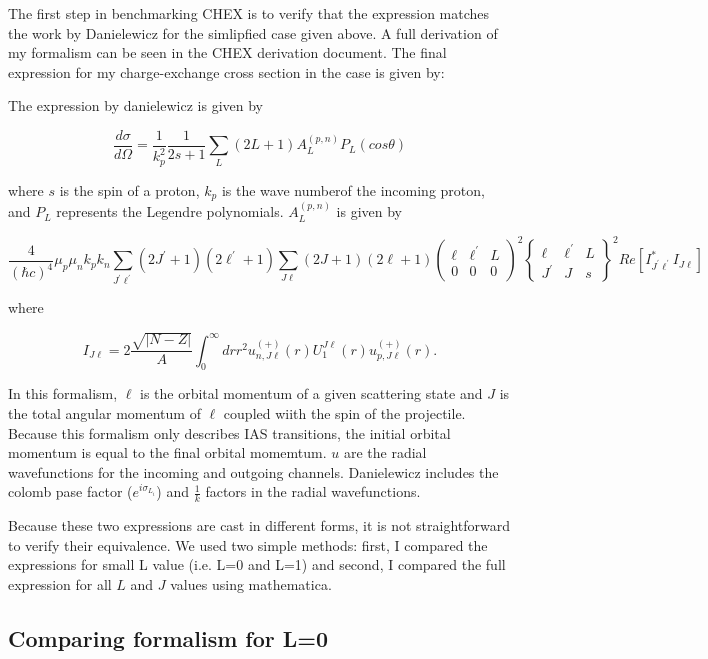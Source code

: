 \documentclass{article}
\newcommand{\Gj}[6]{ \begin{Bmatrix}
  #1 & #2 & #3 \\
  #4 & #5 & #6 
 \end{Bmatrix}}
\newcommand{\tj}[6]{ \begin{pmatrix}
  #1 & #2 & #3 \\
  #4 & #5 & #6 
 \end{pmatrix}}
\begin{document}
The first step in benchmarking CHEX is to verify that the expression matches the work by Danielewicz for the simlipfied case given above.  A full derivation of my formalism can be seen in the CHEX derivation document.  The final expression for my charge-exchange cross section in the case is given by:

The expression by danielewicz is given by

\begin{equation}\label{eq:Danielewicz1}
\frac{d\sigma}{d\Omega}=\frac{1}{k_p^2} \frac{1}{2s+1} \sum_L (2L+1) A_L^{(p,n)} P_L(cos \theta)
\end{equation}

where $s$ is the spin of a proton, $k_p$ is the wave numberof the incoming proton, and $P_L$ represents the Legendre polynomials.  $ A_L^{(p,n)}$ is given by

\begin{equation}\label{eq:Danielewicz2}
\frac{4}{(\hbar c)^4} \mu_p \mu_n k_p k_n \sum_{J^\prime \ell^\prime} (2J^\prime +1)(2 \ell^\prime +1) \sum_{J \ell}(2J+1)(2 \ell +1) \tj{\ell}{\ell^\prime}{L}{0}{0}{0}^2 \Gj{\ell}{\ell^\prime}{L}{J^\prime}{J}{s}^2 Re[I^*_{J^\prime \ell^\prime} I_{J \ell}]
\end{equation}

where

\begin{equation}\label{eq:Danielewicz3}
I_{J \ell}=2 \frac{\sqrt{|N-Z|}}{A} \int^{\infty}_{0} dr r^2 u^{(+)}_{n,J \ell}(r) U^{J \ell}_1 (r) u^{(+)}_{p,J \ell}(r).
\end{equation}

In this formalism, $\ell$ is the orbital momentum of a given scattering state and $J$ is the total angular momentum of $\ell$ coupled wiith the spin of the projectile.  Because this formalism only describes IAS transitions, the initial orbital momentum is equal to the final orbital momemtum.  $u$ are the radial wavefunctions for the incoming and outgoing channels.  Danielewicz includes the colomb pase factor ($e^{i \sigma_{L_i}}$) and $\frac{1}{k}$ factors in the radial wavefunctions.

Because these two expressions are cast in different forms, it is not straightforward to verify their equivalence.  We used two simple methods: first, I compared the expressions for small L value (i.e. L=0 and L=1) and second, I compared the full expression for all $L$ and $J$ values using mathematica.  

\subsection{Comparing formalism for L=0}
\end{document}
